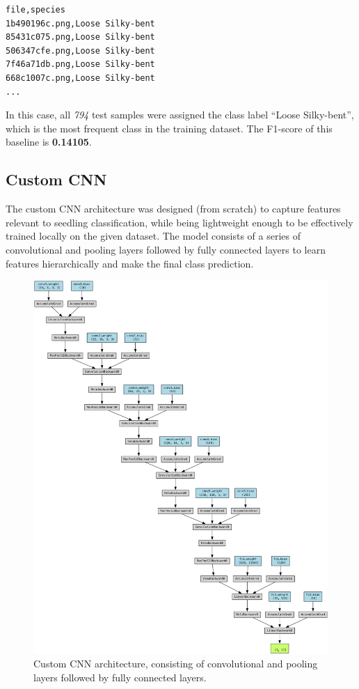 \begin{minipage}{0.9\linewidth}\begin{lstlisting}[language={},caption={Head of guessing baseline submission file.},label={lst:guessing-baseline}]
file,species
1b490196c.png,Loose Silky-bent
85431c075.png,Loose Silky-bent
506347cfe.png,Loose Silky-bent
7f46a71db.png,Loose Silky-bent
668c1007c.png,Loose Silky-bent
...
\end{lstlisting}\end{minipage}

In this case, all \textit{794} test samples were assigned the class label ``Loose Silky-bent'', which is the most frequent class in the training dataset. The F1-score of this baseline is \textbf{0.14105}.

\subsection{Custom CNN}

The custom CNN architecture was designed (from scratch) to capture features relevant to seedling classification, while being lightweight enough to be effectively trained locally on the given dataset. The model consists of a series of convolutional and pooling layers followed by fully connected layers to learn features hierarchically and make the final class prediction.

\begin{figure}[htbp]
    \centerline{\includegraphics[width=0.9\linewidth]{../../resources/custom_cnn/architecture.png}}
    \caption{Custom CNN architecture, consisting of convolutional and pooling layers followed by fully connected layers.}
    \label{fig:custom-cnn-architecture}
\end{figure}

